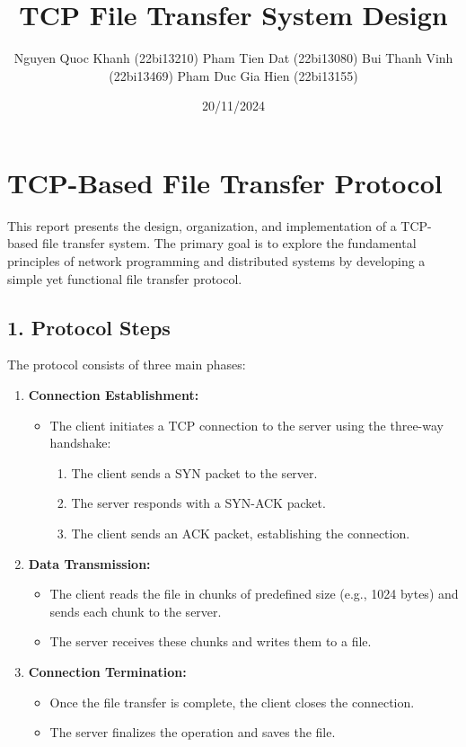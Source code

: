 \documentclass{article}
\title{TCP File Transfer System Design}
\author{
Nguyen Quoc Khanh (22bi13210)
Pham Tien Dat (22bi13080)
Bui Thanh Vinh (22bi13469)
Pham Duc Gia Hien (22bi13155)}
\date{20/11/2024}
\begin{document}
\section*{TCP-Based File Transfer Protocol}

This report presents the design, organization, and implementation of a TCP-based file transfer system. The primary goal is to explore the fundamental principles of network programming and distributed systems by developing a simple yet functional file transfer protocol.

\subsection*{1. Protocol Steps}

The protocol consists of three main phases:

\begin{enumerate}
    \item \textbf{Connection Establishment:}
    \begin{itemize}
        \item The client initiates a TCP connection to the server using the three-way handshake:
        \begin{enumerate}
            \item The client sends a SYN packet to the server.
            \item The server responds with a SYN-ACK packet.
            \item The client sends an ACK packet, establishing the connection.
        \end{enumerate}
    \end{itemize}

    \item \textbf{Data Transmission:}
    \begin{itemize}
        \item The client reads the file in chunks of predefined size (e.g., 1024 bytes) and sends each chunk to the server.
        \item The server receives these chunks and writes them to a file.
    \end{itemize}

    \item \textbf{Connection Termination:}
    \begin{itemize}
        \item Once the file transfer is complete, the client closes the connection.
        \item The server finalizes the operation and saves the file.
    \end{itemize}
\end{enumerate}
\end{document}
